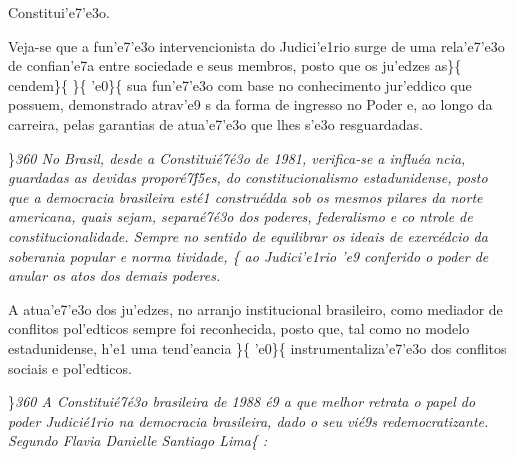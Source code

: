 Constitui'e7'e3o. \par Veja-se que a fun'e7'e3o intervencionista do
Judici'e1rio surge de uma rela'e7'e3o de confian'e7a entre sociedade e
seus membros, posto que os ju'edzes as\}\{\rtlch{}  \ltrch{}
 cendem\}\{\rtlch{}  \ltrch{}
 \}\{\rtlch{}  \ltrch{}
 'e0\}\{\rtlch{}  \ltrch{}
 sua fun'e7'e3o com base no conhecimento
jur'eddico que possuem, demonstrado atrav'e9 s da forma de ingresso no
Poder e, ao longo da carreira, pelas garantias de atua'e7'e3o que lhes
s'e3o resguardadas.
\par \}\pard \ltrpar\qj {}\sl360\widctlpar\wrapdefault\faauto{} {\rtlch{}  \ltrch{}  No Brasil, desde a Constitui\'e7\'e3o de 1981, verifica-se a influ\'ea
ncia, guardadas as devidas propor\'e7\'f5es, do constitucionalismo estadunidense, posto que a democracia brasileira est\'e1 constru\'edda sob os mesmos pilares da norte americana, quais sejam, separa\'e7\'e3o dos poderes, federalismo e co
ntrole de constitucionalidade. Sempre no sentido de equilibrar os ideais de exerc\'edcio da soberania popular e norma}{\rtlch{}  \ltrch{}  tividade, }\{\rtlch{}
 \ltrch{}  ao Judici'e1rio 'e9
conferido o poder de anular os atos dos demais poderes. \par A
atua'e7'e3o dos ju'edzes, no arranjo institucional brasileiro, como
mediador de conflitos pol'edticos sempre foi reconhecida, posto que, tal
como no modelo estadunidense, h'e1 uma tend'eancia \}\{\rtlch{} 
\ltrch{}  'e0\}\{ \rtlch{}  \ltrch{}
 instrumentaliza'e7'e3o dos conflitos
sociais e pol'edticos.
\par \}\pard \ltrpar\qj {}\sl360\widctlpar\wrapdefault\faauto{} {\rtlch{}  \ltrch{}  A Constitui\'e7\'e3o brasileira de 1988 \'e9
 a que melhor retrata o papel do poder Judici\'e1rio na democracia brasileira, dado o seu }{\rtlch{}  \ltrch{}  vi\'e9s redemocratizante. }{\rtlch{}  \ltrch{}  Segundo Flavia }{
\rtlch{}  \ltrch{}  Danielle }{\rtlch{}  \ltrch{}  Santiago Lima}\{\rtlch{}
 \ltrch{}  :
